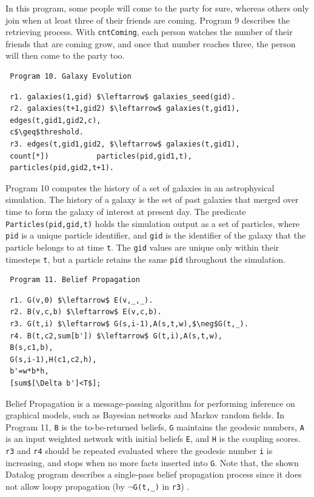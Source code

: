 \begin{appendix}
 In this program, some people will come to the party for sure, whereas others only join when at least three of their friends are coming. Program 9 \cite{7113340} describes the retrieving process. With \texttt{cntComing}, each person watches the number of their friends that are coming grow, and once that number reaches three, the person will then come to the party too.
 
 \begin{verbatim}
 Program 10. Galaxy Evolution
 \end{verbatim}\small
 \begin{lstlisting}
 r1. galaxies(1,gid) $\leftarrow$ galaxies_seed(gid).
 r2. galaxies(t+1,gid2) $\leftarrow$ galaxies(t,gid1),
 edges(t,gid1,gid2,c),
 c$\geq$threshold.
 r3. edges(t,gid1,gid2, $\leftarrow$ galaxies(t,gid1),
 count[*])           particles(pid,gid1,t),
 particles(pid,gid2,t+1).
 \end{lstlisting}
 \normalsize
 
 Program 10 \cite{Wang:2015:AFR:2824032.2824052} computes the history of a set of galaxies in an astrophysical simulation. The history of a galaxy is the set of past galaxies that merged over time to form the galaxy of interest at present day. The predicate \texttt{Particles(pid,gid,t)} holds the simulation output as a set of particles, where \texttt{pid} is a unique particle identifier, and \texttt{gid} is the identifier of the galaxy that the particle belongs to at time \texttt{t}. The \texttt{gid} values are unique only within their timesteps \texttt{t}, but a particle retains the same \texttt{pid} throughout the simulation.
 
 
 \begin{verbatim}
 Program 11. Belief Propagation
 \end{verbatim}\small
 \begin{lstlisting}
 r1. G(v,0) $\leftarrow$ E(v,_,_).
 r2. B(v,c,b) $\leftarrow$ E(v,c,b).
 r3. G(t,i) $\leftarrow$ G(s,i-1),A(s,t,w),$\neg$G(t,_).
 r4. B(t,c2,sum[b']) $\leftarrow$ G(t,i),A(s,t,w),
 B(s,c1,b),
 G(s,i-1),H(c1,c2,h),
 b'=w*b*h,
 [sum$[\Delta b']<T$];
 \end{lstlisting}
 \normalsize
 
 Belief Propagation \cite{910572} is a message-passing algorithm for performing inference on graphical models, such as Bayesian networks and Markov random fields. In Program 11, \texttt{B} is the to-be-returned beliefs, \texttt{G} maintains the geodesic numbers, \texttt{A} is an input weighted network with initial beliefs \texttt{E}, and \texttt{H} is the coupling scores. \texttt{r3} and \texttt{r4} should be repeated evaluated where the geodesic number \texttt{i} is increasing, and stops when no more facts inserted into \texttt{G}. Note that, the shown Datalog program describes a single-pass belief propagation process since it does not allow loopy propagation (by $\neg$\texttt{G(t,\_)} in \texttt{r3}) \cite{Gatterbauer:2015:LSB:2735479.2735490}.
 

\end{appendix}
